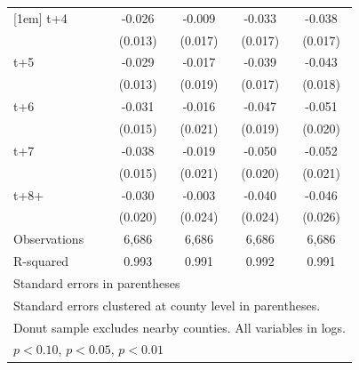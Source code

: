\begin{table}[htbp]
\begin{tabular}{l*{4}{c}}
[1em]
t+4         &      -0.026\sym{**} &      -0.009         &      -0.033\sym{**} &      -0.038\sym{**} \\
            &     (0.013)         &     (0.017)         &     (0.017)         &     (0.017)         \\
[1em]
t+5         &      -0.029\sym{**} &      -0.017         &      -0.039\sym{**} &      -0.043\sym{**} \\
            &     (0.013)         &     (0.019)         &     (0.017)         &     (0.018)         \\
[1em]
t+6         &      -0.031\sym{**} &      -0.016         &      -0.047\sym{**} &      -0.051\sym{**} \\
            &     (0.015)         &     (0.021)         &     (0.019)         &     (0.020)         \\
[1em]
t+7         &      -0.038\sym{**} &      -0.019         &      -0.050\sym{**} &      -0.052\sym{**} \\
            &     (0.015)         &     (0.021)         &     (0.020)         &     (0.021)         \\
[1em]
t+8+        &      -0.030         &      -0.003         &      -0.040\sym{*}  &      -0.046\sym{*}  \\
            &     (0.020)         &     (0.024)         &     (0.024)         &     (0.026)         \\
\hline
Observations&       6,686         &       6,686         &       6,686         &       6,686         \\
R-squared   &       0.993         &       0.991         &       0.992         &       0.991         \\
\hline\hline
\multicolumn{5}{l}{\footnotesize Standard errors in parentheses}\\
\multicolumn{5}{l}{\footnotesize Standard errors clustered at county level in parentheses.}\\
\multicolumn{5}{l}{\footnotesize Donut sample excludes nearby counties. All variables in logs.}\\
\multicolumn{5}{l}{\footnotesize \sym{*} \(p<0.10\), \sym{**} \(p<0.05\), \sym{***} \(p<0.01\)}\\
\end{tabular}
\end{table}
